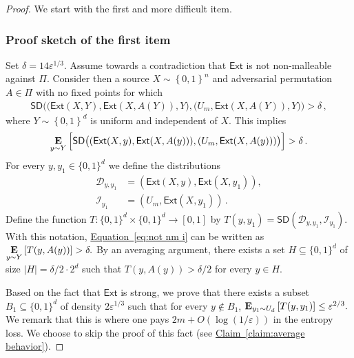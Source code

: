 \documentclass[11pt]{article}
\numberwithin{equation}{section}
\theoremstyle{definition}
\theoremstyle{plain}
\newcommand{\expref}[2]{\hyperref[#2]{#1~\ref{#2}}}
\newcommand{\expeqref}[2]{\hyperref[#2]{#1~\eqref{#2}}}
\newcommand{\ext}{\mathsf{Ext}}
\newcommand{\adv}{A}
\newcommand{\eps}{\varepsilon}
\newcommand{\perfam}{\Pi}
\newcommand{\set}[1]{\left\{{#1}\right\}}
\newcommand{\B}{\set{0,1}}
\newcommand{\E}{\mathop{\bf E\/}}
\def\SD{\ensuremath{\mathsf{SD}}}
\begin{document}
\begin{proof}
We start with the first and more difficult item.
%
\subsubsection*{Proof sketch of the first item}
Set $\delta =14\eps^{1/3}$. Assume towards a contradiction that $\ext$ is not non-malleable against $\perfam$. Consider then a source $X\sim \B^n$ and adversarial permutation $\adv \in \Pi$ with no fixed points for which
	\begin{align*}
	\SD \Big( \big( \ext(X,Y), \ext(X,\adv(Y)), Y \big), 
	\big( U_m, \ext(X,\adv(Y)),  Y \big)
	\Big) > \delta\,,
	\end{align*}
 where $Y \sim \B^d$ is uniform and independent of $X$.
	This implies
	\begin{align}\label{eq:not nm i}
	\E_{y \sim Y}\Big[ \SD\big( ( \ext(X,y), \ext(X,\adv(y)) ), 
	( U_m, \ext(X,\adv(y)) )\big) \Big] > \delta\,.
	\end{align}
	For every $y,y_1 \in \{0,1\}^d$ we define the distributions 
	\begin{align*}
	\mathcal{D}_{y,y_1} &= \left( \ext(X,y), \ext(X,y_1)  \right), \\
	\mathcal{I}_{y_1}   &= \left(U_m, \ext(X,y_1) \right)\,.
	\end{align*}
	Define the function $T \colon \{0,1\}^d \times \{0,1\}^d \to [0,1]$ by
	$
	T(y,y_1) = \SD\left( \mathcal{D}_{y,y_1}, \mathcal{I}_{y_1} \right).
	$
	With this notation, \expeqref{Equation}{eq:not nm i} can be written as
	$
	\E\limits_{y \sim Y}{\left[T(y,\adv(y))\right]} > \delta.
	$
	By an averaging argument, there exists a set $H \subseteq \{0,1\}^d$ of size 
	$|H| = \delta/2 \cdot 2^d$ such that
	$T(y,\adv(y)) > \delta/2$ 
	for every $y \in H$.
	
	Based on the fact that $\ext$ is strong, we prove that  	
	there exists a subset $B_1 \subseteq \{0,1\}^d$ of density $2\eps^{1/3}$ such that for every $y \notin B_1$, $
		\E_{y_1 \sim U_{d}}\left[T(y,y_1)\right] \le \eps^{2/3}.$ We remark that this is where one pays $2m+O(\log(1/\eps))$ in the entropy loss. We choose to skip the proof of this fact (see \expref{Claim}{claim:average behavior}).


\end{proof}
\end{document}
